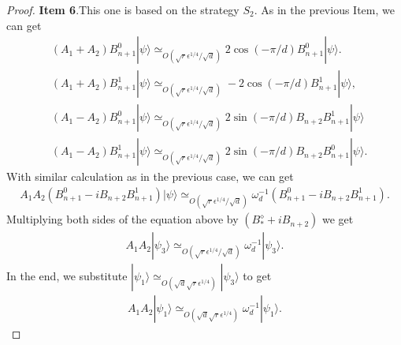 \documentclass[11pt,letterpaper]{article}
\newcommand{\ket}[1]{|#1\rangle}
\newcommand{\1}{\mathbb{1}}
\newcommand{\qe}{\epsilon^{1/4}}
\newcommand{\sd}{\sqrt{d}}
\newcommand{\sr}{\sqrt{r}}
\newcommand{\appd}[1]{\simeq_{#1}}
\theoremstyle{definition}
\begin{document}
\begin{proof}
	\textbf{Item 6}.This one is based on the strategy $S_2$. As in the previous Item,
	we can get
	\begin{align}
		&(A_1+A_2) B_{n+1}^0 \ket{\psi} \appd{O(\sr \qe/\sd)} 2 \cos(-\pi/d)B_{n+1}^0 \ket{\psi}.\\
		&(A_1+A_2) B_{n+1}^1 \ket{\psi}  \appd{O(\sr \qe/\sd)} -2 \cos(-\pi/d)B_{n+1}^1 \ket{\psi},\\
		&(A_1-A_2) B_{n+1}^0\ket{\psi} \appd{O(\sr\qe/\sd)}2 \sin(-\pi/d)B_{n+2} B_{n+1}^1\ket{\psi}\\
		&(A_1 -A_2)B_{n+1}^1 \ket{\psi} \appd{O(\sr\qe/\sd)} 2 \sin(-\pi/d)B_{n+2} B_{n+1}^0 \ket{\psi}.
	\end{align}
	With similar calculation as in the previous case, we can get 
	\begin{align}
		A_1A_2 (B_{n+1}^0 - i B_{n+2}B_{n+1}^1) \ket{\psi} \appd{O(\sr \qe/\sd)} \omega_d^{-1} (B_{n+1}^0 - i B_{n+2}B_{n+1}^1).
	\end{align}
	Multiplying both sides of the equation above by $(B_\ast^\diamond+iB_{n+2})$ we get
	\begin{align}
		A_1A_2 \ket{\psi_3} \appd{O(\sr \qe/\sd)} \omega_d^{-1}\ket{\psi_3}.
	\end{align}
	In the end, we substitute $\ket{\psi_1}  \appd{O(\sd \sr\qe)} \ket{\psi_3}$ to get
	\begin{align}
		A_1A_2 \ket{\psi_1} \appd{O(\sd \sr \qe)} \omega_d^{-1}\ket{\psi_1}.
	\end{align}
\end{proof}

\end{document}
